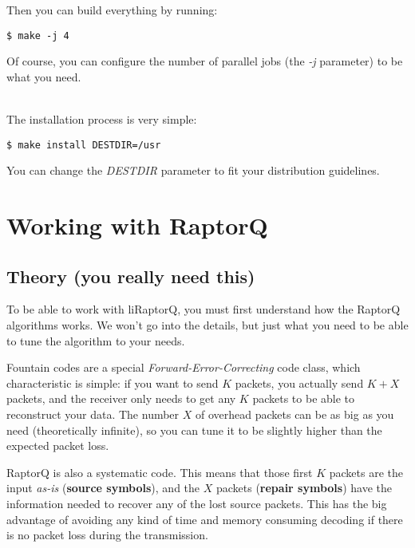 \documentclass[11pt,a4paper]{refart}
\begin{document}
Then you can build everything by running:
\begin{verbatim}
$ make -j 4
\end{verbatim}

Of course, you can configure the number of parallel jobs (the \textit{-j} parameter) to be what you need.

~\\

The installation process is very simple:

\begin{verbatim}
$ make install DESTDIR=/usr
\end{verbatim}

You can change the \textit{DESTDIR} parameter to fit your distribution guidelines.
\newpage


\section{Working with RaptorQ}
\subsection{Theory (you really need this)}

To be able to work with liRaptorQ, you must first understand how the RaptorQ algorithms works. We won't go into the details, but just what you need
to be able to tune the algorithm to your needs.


Fountain codes are a special \textit{Forward-Error-Correcting} code class, which characteristic is simple: if you want to send $K$ packets, you actually
send $K+X$ packets, and the receiver only needs to get any $K$ packets to be able to reconstruct your data. The number $X$ of overhead packets can be as big
as you need (theoretically infinite), so you can tune it to be slightly higher than the expected packet loss.

 RaptorQ is also a systematic code. This means that those first $K$ packets are the input \textit{as-is} (\textbf{source symbols}),
and the $X$ packets (\textbf{repair symbols}) have the information needed to recover any of the lost source packets. This has the big advantage of
avoiding any kind of time and memory consuming decoding if there is no packet loss during the transmission.
\end{document}
